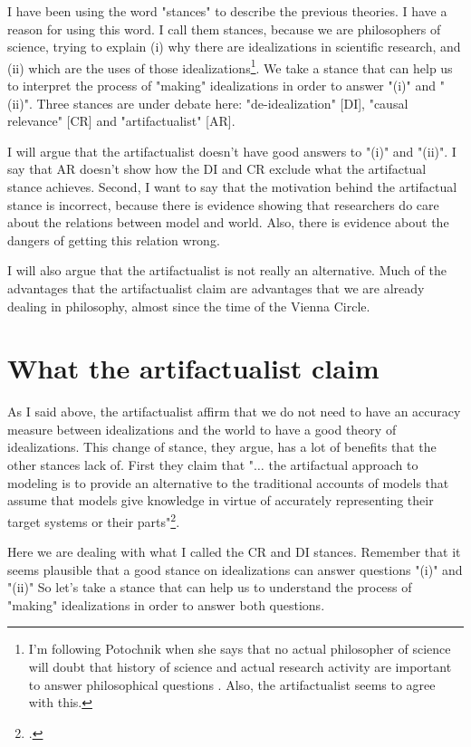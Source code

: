 I have been using the word "stances" to describe the previous theories.
I have a reason for using this word.
I call them stances, because we are philosophers of science, trying to explain (i) why there are idealizations in scientific research, and (ii) which are the uses of those idealizations\footnote{I'm following Potochnik when she says that no actual philosopher of science will doubt that history of science and actual research activity are important to answer philosophical questions \citeyear[cfr.][p. 9]{Potochnik2017-POTIAT-3}. Also, the artifactualist seems to agree with this.}.
We take a stance that can help us to interpret the process of "making" idealizations in order to answer "(i)" and "(ii)".
Three stances are under debate here: "de-idealization" [DI], "causal relevance" [CR] and "artifactualist" [AR].

I will argue that the artifactualist doesn't have good answers to "(i)" and "(ii)".
I say that AR doesn't show how the DI and CR exclude what the artifactual stance achieves.
Second, I want to say that the motivation behind the artifactual stance is incorrect, because there is evidence showing that researchers do care about the relations between model and world.
Also, there is evidence about the dangers of getting this relation wrong.

I will also argue that the artifactualist is not really an alternative.
Much of the advantages that the artifactualist claim are advantages that we are already dealing in philosophy, almost since the time of the Vienna Circle.


\section{What the artifactualist claim}

As I said above, the artifactualist affirm that we do not need to have an accuracy measure between idealizations and the world to have a good theory of idealizations.
This change of stance, they argue, has a lot of benefits that the other stances lack of.
First they claim that "$\ldots$ the artifactual approach to modeling is to provide an alternative to the traditional accounts of models that assume that models give knowledge in virtue of accurately representing their target systems or their parts"\footcite[][pp. 51-52]{Carrillo2022}.

Here we are dealing with what I called the CR and DI stances.
Remember that it seems plausible that a good stance on idealizations can answer questions "(i)" and "(ii)"
So let's take a stance that can help us to understand the process of "making" idealizations in order to answer both questions.


